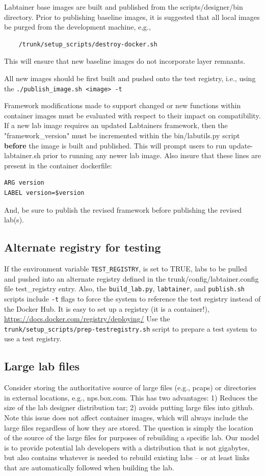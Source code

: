 \documentclass[12pt]{article}
\begin{document}
Labtainer base images are built and published from the scripts/designer/bin directory.  Prior to publishing
baseline images, it is suggested that all local images be purged from the development machine, e,g.,
\begin{verbatim}
    /trunk/setup_scripts/destroy-docker.sh
\end{verbatim}
\noindent This will ensure that new baseline images do not incorporate layer remnants.

All new images should be first built and pushed onto the test registry, i.e., using the 
{\tt ./publish\_image.sh <image> -t}

Framework modifications made to support changed or new functions within container images
must be evaluated with respect to their impact on compatibility. If a new lab image requires
an updated Labtainers framework, then the "framework\_version" must be incremented within the
bin/labutils.py script \textbf{before} the image is built and published.  This will prompt users
to run update-labtainer.sh prior to running any newer lab image. 
Also insure that these lines are present in the container dockerfile:
\begin{verbatim}
ARG version
LABEL version=$version
\end{verbatim}
\noindent And, be sure to publish the revised framework before publishing the revised lab(s).

\subsection{Alternate registry for testing}
If the environment variable {\tt TEST\_REGISTRY}, is set to TRUE, labs to be pulled and pushed
into an alternate registry defined in the trunk/config/labtainer.config file test\_registry entry.
Also, the {\tt build\_lab.py}, {\tt labtainer}, and {\tt publish.sh} scripts include {\tt -t} flags to
force the system to reference the test registry instead of the Docker Hub.
It is easy to set up a registry (it is a container!), \url{https://docs.docker.com/registry/deploying/}
Use the {\tt trunk/setup\_scripts/prep-testregistry.sh} script to
prepare a test system to use a test registry.

\subsection{Large lab files}
Consider storing the authoritative source of large files (e.g., pcaps) or directories in external locations, e.g., nps.box.com.  This has two
advantages:  1) Reduces the size of the lab designer distribution tar; 2) avoids putting large files
into github.  Note this issue does not affect container images, which will always include the large files regardless of how they
are stored.  The question is simply the location of the source of the large files for purposes of
rebuilding a specific lab.   Our model is to provide potential lab developers with a distribution that is not gigabytes, but also contains
whatever is needed to rebuild existing labs -- or at least links that are automatically followed when building the lab.
\end{document}
